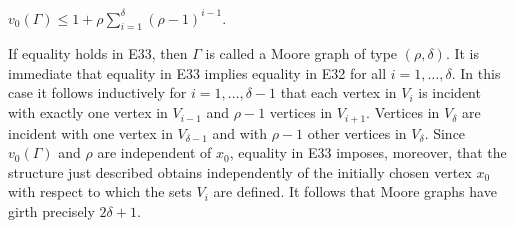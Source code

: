 $v_0(\Gamma) \leq 1 + \rho \sum_{i=1}^{\delta} (\rho - 1)^{i-1}$.

If equality holds in E33, then $\Gamma$ is called a Moore graph of type $(\rho, \delta)$. It is immediate that equality in E33 implies equality in E32 for all $i = 1, \ldots, \delta$. In this case it follows inductively for $i = 1, \ldots, \delta - 1$ that each vertex in $V_i$ is incident with exactly one vertex in $V_{i-1}$ and $\rho - 1$ vertices in $V_{i+1}$. Vertices in $V_\delta$ are incident with one vertex in $V_{\delta-1}$ and with $\rho - 1$ other vertices in $V_\delta$. Since $v_0(\Gamma)$ and $\rho$ are independent of $x_0$, equality in E33 imposes, moreover, that the structure just described obtains independently of the initially chosen vertex $x_0$ with respect to which the sets $V_i$ are defined. It follows that Moore graphs have girth precisely $2\delta + 1$.
